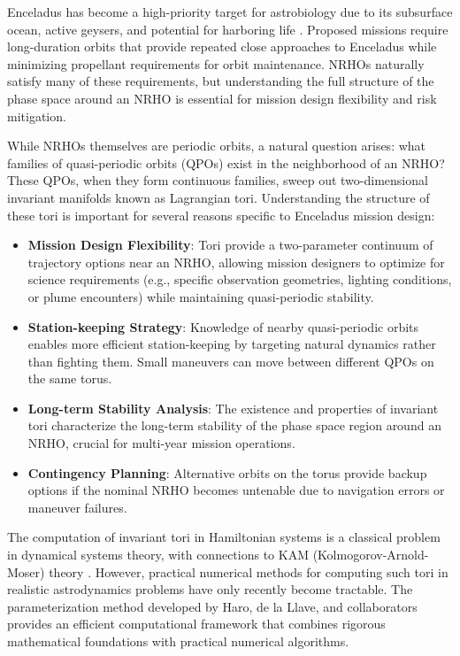 \documentclass[review,onefignum,onetabnum]{siamart220329}
\begin{document}
Enceladus has become a high-priority target for astrobiology due to its subsurface
ocean, active geysers, and potential for harboring life \cite{cable2021enceladus}.
Proposed missions require long-duration orbits that provide repeated close
approaches to Enceladus while minimizing propellant requirements for orbit
maintenance. NRHOs naturally satisfy many of these requirements, but understanding
the full structure of the phase space around an NRHO is essential for mission
design flexibility and risk mitigation.

While NRHOs themselves are periodic orbits, a natural question arises: what
families of quasi-periodic orbits (QPOs) exist in the neighborhood of an NRHO?
These QPOs, when they form continuous families, sweep out two-dimensional
invariant manifolds known as Lagrangian tori. Understanding the structure of
these tori is important for several reasons specific to Enceladus mission design:

\begin{itemize}
    \item \textbf{Mission Design Flexibility}: Tori provide a two-parameter
          continuum of trajectory options near an NRHO, allowing mission designers
          to optimize for science requirements (e.g., specific observation
          geometries, lighting conditions, or plume encounters) while maintaining
          quasi-periodic stability.

    \item \textbf{Station-keeping Strategy}: Knowledge of nearby quasi-periodic
          orbits enables more efficient station-keeping by targeting natural
          dynamics rather than fighting them. Small maneuvers can move between
          different QPOs on the same torus.

    \item \textbf{Long-term Stability Analysis}: The existence and properties of
          invariant tori characterize the long-term stability of the phase space
          region around an NRHO, crucial for multi-year mission operations.

    \item \textbf{Contingency Planning}: Alternative orbits on the torus provide
          backup options if the nominal NRHO becomes untenable due to navigation
          errors or maneuver failures.
\end{itemize}

The computation of invariant tori in Hamiltonian systems is a classical problem
in dynamical systems theory, with connections to KAM (Kolmogorov-Arnold-Moser)
theory \cite{kolmogorov1954conservation,arnold1963proof,moser1962invariant}.
However, practical numerical methods for computing such tori in realistic astrodynamics
problems have only recently become tractable. The parameterization method developed
by Haro, de la Llave, and collaborators
\cite{haro2006parameterization,haro2016parameterization} provides an efficient
computational framework that combines rigorous mathematical foundations with
practical numerical algorithms.
\end{document}
